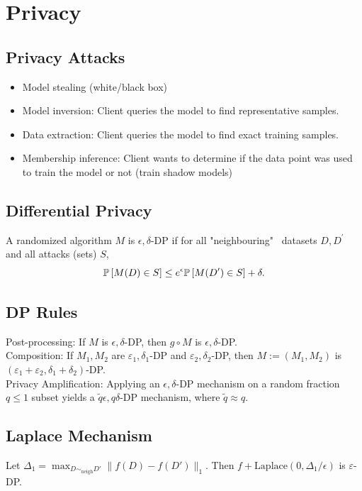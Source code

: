 \section{Privacy}
\subsection*{Privacy Attacks}
\begin{itemize}
    \item Model stealing (white/black box)
    \item Model inversion: Client queries the model to find representative samples.
    \item Data extraction: Client queries the model to find exact training samples.
    \item Membership inference: Client wants to determine if the data
          point was used to train the model or not (train shadow models)
\end{itemize}

\subsection*{Differential Privacy}
A randomized algorithm $M$ is $\epsilon, \delta$-DP if for all "neighbouring" \ datasets $D, D^\prime$ and all attacks (sets) $S$,
$$\P\left[M(D)\in S\right] \le e^\epsilon \P\left[M(D^\prime)\in S\right]+\delta.$$
\vspace*{-4mm}
\subsection*{DP Rules}
Post-processing: If $M$ is $\epsilon,\delta$-DP, then $g\circ M$ is $\epsilon,\delta$-DP.\\
Composition: If $M_1,M_2$ are $\varepsilon_1,\delta_1$-DP and $\varepsilon_2,\delta_2$-DP, then $M:=(M_1,M_2)$ is $(\varepsilon_1+\varepsilon_2,\delta_1+\delta_2)$-DP.\\
Privacy Amplification: Applying an $\epsilon,\delta$-DP mechanism on a random fraction $q\leq1$ subset yields a $\tilde{q}\epsilon,q\delta$-DP mechanism, where $\tilde{q}\approx q$.

\subsection*{Laplace Mechanism}
Let $\Delta_1=\max_{D\sim_{\text{neigh}}D'}\|f(D)-f(D')\|_{1}$. Then $f+\text{Laplace}(0,\Delta_1/\epsilon)$ is $\varepsilon$-DP.

